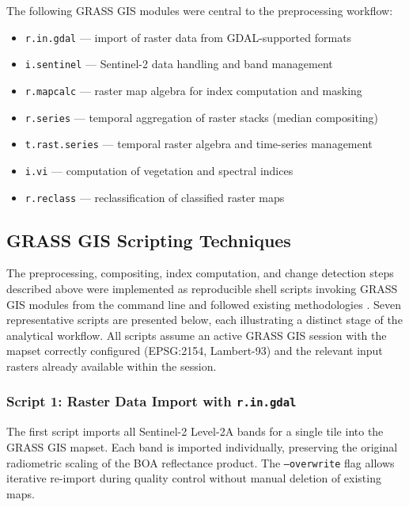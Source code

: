 \documentclass[remotesensing,article,submit,pdftex,moreauthors]{Definitions/mdpi}
\begin{document}
The following GRASS GIS modules were central to the preprocessing workflow:
\begin{itemize}
\item \texttt{r.in.gdal} — import of raster data from GDAL-supported formats
\item \texttt{i.sentinel} — Sentinel-2 data handling and band management
\item \texttt{r.mapcalc} — raster map algebra for index computation and masking
\item \texttt{r.series} — temporal aggregation of raster stacks (median compositing)
\item \texttt{t.rast.series} — temporal raster algebra and time-series management
\item \texttt{i.vi} — computation of vegetation and spectral indices
\item \texttt{r.reclass} — reclassification of classified raster maps
\end{itemize}

\subsection{GRASS GIS Scripting Techniques}

The preprocessing, compositing, index computation, and change detection steps described above were implemented as reproducible shell scripts invoking GRASS GIS modules from the command line and followed existing methodologies \citep{Lemenkova202405,Lemenkova202322,Lemenkova202323}. Seven representative scripts are presented below, each illustrating a distinct stage of the analytical workflow. All scripts assume an active GRASS GIS session with the mapset correctly configured (EPSG:2154, Lambert-93) and the relevant input rasters already available within the session.

\subsubsection*{Script 1: Raster Data Import with \texttt{r.in.gdal}}

The first script imports all Sentinel-2 Level-2A bands for a single tile into the GRASS GIS mapset. Each band is imported individually, preserving the original radiometric scaling of the BOA reflectance product. The \texttt{--overwrite} flag allows iterative re-import during quality control without manual deletion of existing maps.
\end{document}
